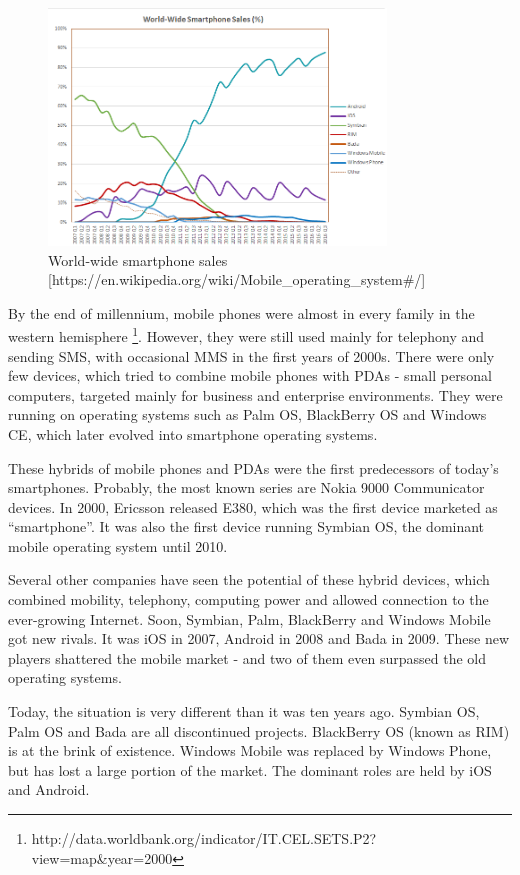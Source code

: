 \documentclass[english,master,public,dept460,male,cpdeclaration,oneside]{diploma}
\begin{document}
\begin{figure}[!ht]
\centering\includegraphics[width=0.8\textwidth]{Figures/World_Wide_Smartphone_Sales_Share.png}
\caption{World-wide smartphone sales [https://en.wikipedia.org/wiki/Mobile\_operating\_system\#/]}
\end{figure}

By the end of millennium, mobile phones were almost in every family in the western hemisphere \footnote{http://data.worldbank.org/indicator/IT.CEL.SETS.P2?view=map\&year=2000}. However, they were still used mainly for telephony and sending SMS, with occasional MMS in the first years of 2000s. There were only few devices, which tried to combine mobile phones with PDAs - small personal computers, targeted mainly for business and enterprise environments. They were running on operating systems such as Palm OS, BlackBerry OS and Windows CE, which later evolved into smartphone operating systems.

These hybrids of mobile phones and PDAs were the first predecessors of today’s smartphones. Probably, the most known series are Nokia 9000 Communicator devices. In 2000, Ericsson released E380, which was the first device marketed as “smartphone”. It was also the first device running Symbian OS, the dominant mobile operating system until 2010.

Several other companies have seen the potential of these hybrid devices, which combined mobility, telephony, computing power and allowed connection to the ever-growing Internet. Soon, Symbian, Palm, BlackBerry and Windows Mobile got new rivals. It was iOS in 2007, Android in 2008 and Bada in 2009. These new players shattered the mobile market - and two of them even surpassed the old operating systems. 

Today, the situation is very different than it was ten years ago. Symbian OS, Palm OS and Bada are all discontinued projects. BlackBerry OS (known as RIM) is at the brink of existence. Windows Mobile was replaced by Windows Phone, but has lost a large portion of the market. The dominant roles are held by iOS and Android.
\end{document}
